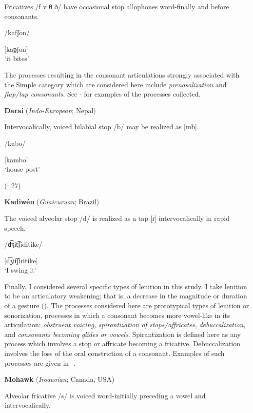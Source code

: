 Fricatives /f v θ ð/ have occasional stop allophones word-finally and before consonants.

/kafʃon/

[kap̪ʃon]\\
\glt ‘it bites’
\citep[16]{Newmark1957}
\z

  The processes resulting in the consonant articulations strongly associated with the Simple category which are considered here include \textit{prenasalization} and \textit{flap/tap consonants}. See - for examples of the processes collected.

\ea\label{ex:7.12}
  \textbf{Darai} (\textit{Indo-European}; Nepal)

Intervocalically, voiced bilabial stop /b/ may be realized as [mb].

/kabo/

[kambo]\\
\glt ‘house post’

(\citealt{KotapishKotapish1973}: 27)
\z

\ea\label{ex:7.13}
  \textbf{Kadiwéu} (\textit{Guaicuruan}; Brazil)

The voiced alveolar stop /d/ is realized as a tap [ɾ] intervocalically in rapid speech.

/d͡ʒit͡ʃiditike/

[d͡ʒit͡ʃiɾitike]\\
\glt ‘I swing it’
\citep[16]{Sandalo1997}
\z

  Finally, I considered several specific types of lenition in this study. I take lenition to be an articulatory weakening; that is, a decrease in the magnitude or duration of a gesture (\citealt{BrowmanGoldstein1992b,MowreyPagliuca1995,BybeeEasterday2019}). The processes considered here are prototypical types of lenition or sonorization, processes in which a consonant becomes more vowel-like in its articulation: \textit{obstruent voicing, spirantization of stops/affricates}, \textit{debuccalization}, and \textit{consonants becoming glides or vowels}. Spirantization is defined here as any process which involves a stop or affricate becoming a fricative. Debuccalization involves the loss of the oral constriction of a consonant. Examples of such processes are given in -.

\ea\label{ex:7.14}
  \textbf{Mohawk} (\textit{Iroquoian}; Canada, USA)

Alveolar fricative /s/ is voiced word-initially preceding a vowel and intervocalically.

